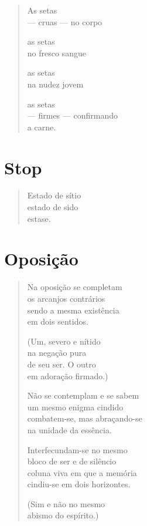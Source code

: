 \begin{verse}
As setas\\
--- cruas --- no corpo

as setas\\
no fresco sangue

as setas\\
na nudez jovem

as setas\\
--- firmes --- confirmando\\
\qquad\qquad\qquad\quad a carne.
\end{verse}


\chapter{Stop}

\begin{verse}
Estado de sítio\\
estado de sido\\
estase.
\end{verse}

\chapter{Oposição}

\begin{verse}
Na oposição se completam\\
os arcanjos contrários\\
sendo a mesma existência\\
em dois sentidos.

(Um, severo e nítido\\
na negação pura\\
de seu ser. O outro\\
em adoração firmado.)

Não se contemplam e se sabem\\
um mesmo enigma cindido\\
combatem-se, mas abraçando-se\\
na unidade da essência.

Interfecundam-se no mesmo\\
bloco de ser e de silêncio\\
coluna viva em que a memória\\
cindiu-se em dois horizontes.

(Sim e não no mesmo\\
abismo do espírito.)
\end{verse}

